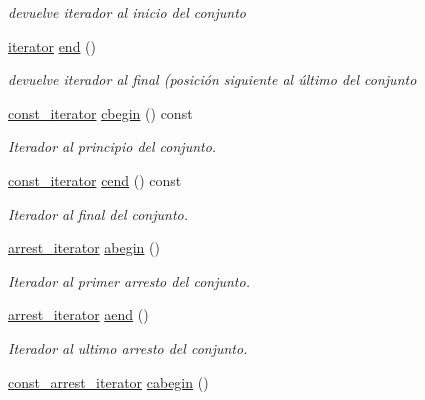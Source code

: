 \begin{DoxyCompactItemize}
\begin{DoxyCompactList}\small\item\em devuelve iterador al inicio del conjunto \end{DoxyCompactList}\item 
\hypertarget{classconjunto_adeef17ca21f1fb29f803790c89c1fc56}{}\hyperlink{classconjunto_1_1iterator}{iterator} \hyperlink{classconjunto_adeef17ca21f1fb29f803790c89c1fc56}{end} ()\label{classconjunto_adeef17ca21f1fb29f803790c89c1fc56}

\begin{DoxyCompactList}\small\item\em devuelve iterador al final (posición siguiente al último del conjunto \end{DoxyCompactList}\item 
\hyperlink{classconjunto_1_1const__iterator}{const\+\_\+iterator} \hyperlink{classconjunto_aea13fde96ef2566de65be9a8163b1c26}{cbegin} () const 
\begin{DoxyCompactList}\small\item\em Iterador al principio del conjunto. \end{DoxyCompactList}\item 
\hyperlink{classconjunto_1_1const__iterator}{const\+\_\+iterator} \hyperlink{classconjunto_a8f641464f071358f97c6f4a2c59f2117}{cend} () const 
\begin{DoxyCompactList}\small\item\em Iterador al final del conjunto. \end{DoxyCompactList}\item 
\hyperlink{classconjunto_1_1arrest__iterator}{arrest\+\_\+iterator} \hyperlink{classconjunto_aae3e108ee38c624ca0a1f5e11fe7a1b0}{abegin} ()
\begin{DoxyCompactList}\small\item\em Iterador al primer arresto del conjunto. \end{DoxyCompactList}\item 
\hyperlink{classconjunto_1_1arrest__iterator}{arrest\+\_\+iterator} \hyperlink{classconjunto_a4464a19d9757c22306815d66749d072c}{aend} ()
\begin{DoxyCompactList}\small\item\em Iterador al ultimo arresto del conjunto. \end{DoxyCompactList}\item 
\hyperlink{classconjunto_1_1const__arrest__iterator}{const\+\_\+arrest\+\_\+iterator} \hyperlink{classconjunto_acc4b0c0f036cbffebf4e8440206103b6}{cabegin} ()

\end{DoxyCompactItemize}
